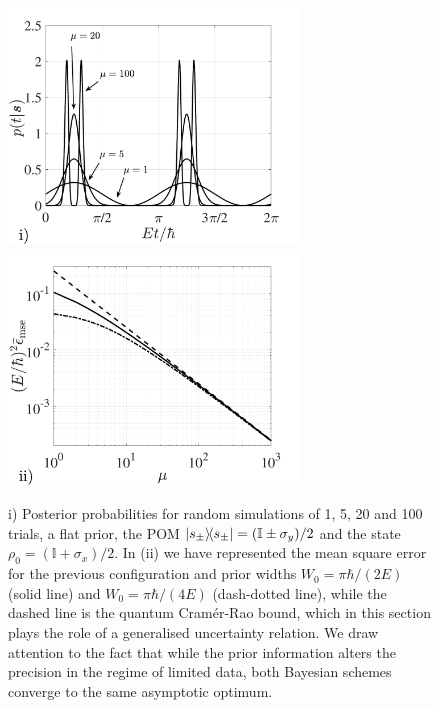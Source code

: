 \begin{figure}[t]
\centering
\includegraphics[trim={0.1cm 0.1cm 0.5cm 0.5cm},clip,width=7.7cm]{pictures/ch8_fig2i}\includegraphics[trim={0cm 0cm 0.5cm 0.5cm},clip,width=7.7cm]{pictures/ch8_fig2ii} 
\caption[Bayesian time estimation]{i) Posterior probabilities for random simulations of 1, 5, 20 and 100 trials, a flat prior, the POM $\ketbra{s_\pm} = (\mathbb{I} \pm \sigma_y)/2$ and the state $\rho_0 = (\mathbb{I}+\sigma_x)/2$. In (ii) we have represented the mean square error for the previous configuration and prior widths $W_0=\pi\hbar/(2E)$ (solid line) and $W_0=\pi\hbar/(4E)$ (dash-dotted line), while the dashed line is the quantum Cram\'{e}r-Rao bound, which in this section plays the role of a generalised uncertainty relation. We draw attention to the fact that while the prior information alters the precision in the regime of limited data, both Bayesian schemes converge to the same asymptotic optimum.}
\label{timeestimation}
\end{figure}

